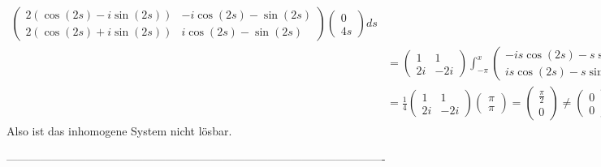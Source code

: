\begin{solution}
\begin{enumerate}[label = \textbf{\alph*)}]
\begin{align*}
\begin{pmatrix}
      2(\cos(2s) - i\sin(2s)) & -i\cos(2s) - \sin(2s) \\
      2(\cos(2s) + i\sin(2s)) & i\cos(2s) - \sin(2s)
    \end{pmatrix}
    \begin{pmatrix}
      0 \\ 4s
    \end{pmatrix} ds \\
    &= \begin{pmatrix}
      1 & 1 \\ 2i & -2i
    \end{pmatrix}\int_{-\pi}^x
    \begin{pmatrix}
      -is\cos(2s) - s\sin(2s) \\
      is\cos(2s) - s\sin(2s)
    \end{pmatrix}ds \\
    &= \frac{1}{4}\begin{pmatrix}
      1 & 1 \\ 2i & -2i
    \end{pmatrix}
    \begin{pmatrix}
      \pi \\
      \pi
    \end{pmatrix}
    = \begin{pmatrix}
      \frac{\pi}{2} \\ 0
    \end{pmatrix}
    \neq \begin{pmatrix}
      0 \\ 0
    \end{pmatrix}.
  \end{align*}
  Also ist das inhomogene System nicht lösbar.

 ----------------------------------------------------------------------------------------------------


\end{enumerate}
\end{solution}
